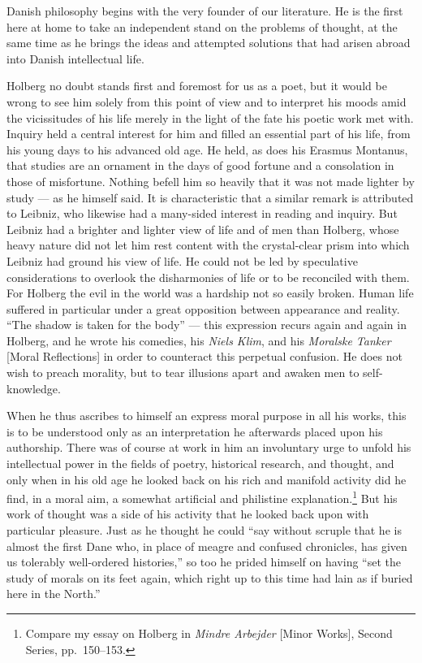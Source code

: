 \documentclass[12pt,a4paper]{book}
\newcommand{\opage}[1]{\marginnote{\footnotesize\textit{[#1]}}}
\begin{document}
\noindent \opage{3}Danish philosophy begins with the very founder of our literature. He
is the first here at home to take an independent stand on the problems of
thought, at the same time as he brings the ideas and attempted solutions that
had arisen abroad into Danish intellectual life.

Holberg no doubt stands first and foremost for us as a poet, but it would be
wrong to see him solely from this point of view and to interpret his moods amid
the vicissitudes of his life merely in the light of the fate his poetic work
met with. Inquiry held a central interest for him and filled an essential part
of his life, from his young days to his advanced old age. He held, as does his
Erasmus Montanus, that studies are an ornament in the days of good fortune and
a consolation in those of misfortune. Nothing befell him so heavily that it was
not made lighter by study --- as he himself said. It is characteristic that a
similar remark is attributed to Leibniz, who likewise had a many-sided interest
in reading and inquiry. But Leibniz had a brighter and lighter view of life and
of men than Holberg, whose heavy nature did not let him rest content with the
crystal-clear prism into which Leibniz had ground his view of life. He could not
be led by speculative considerations to overlook the disharmonies of life or to
be reconciled with them. For Holberg the evil in the world was a hardship not so
easily broken. Human life suffered in particular under a great opposition
between appearance and reality. ``The shadow is taken for the body'' --- this
expression recurs again and again in Holberg, and he wrote his comedies, his
\emph{Niels Klim}, and his \emph{Moralske Tanker} [Moral Reflections] \opage{4}in order
to counteract this perpetual confusion. He does not wish to preach morality, but
to tear illusions apart and awaken men to self-knowledge.

When he thus ascribes to himself an express moral purpose in all his works,
this is to be understood only as an interpretation he afterwards placed upon his
authorship. There was of course at work in him an involuntary urge to unfold his
intellectual power in the fields of poetry, historical research, and thought,
and only when in his old age he looked back on his rich and manifold activity
did he find, in a moral aim, a somewhat artificial and philistine
explanation.\footnote{Compare my essay on Holberg in \emph{Mindre Arbejder}
[Minor Works], Second Series, pp.~150--153.} But his work of thought was a side
of his activity that he looked back upon with particular pleasure. Just as he
thought he could ``say without scruple that he is almost the first Dane who, in
place of meagre and confused chronicles, has given us tolerably well-ordered
histories,'' so too he prided himself on having ``set the study of morals on its
feet again, which right up to this time had lain as if buried here in the
North.''
\end{document}
